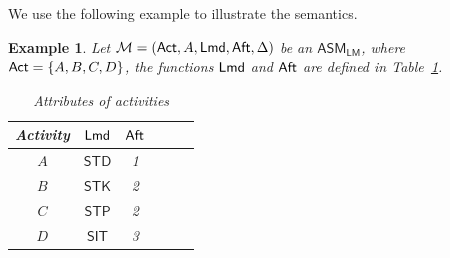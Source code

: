 \documentclass[preprint,12pt]{elsarticle}
\newtheorem{example}{Example}
\newcommand\Mm{{\mathcal{M} }}
\newcommand\act{{\sf Act}}
\newcommand\aft{{\sf Aft}}
\newcommand\lmd{{\sf Lmd}}
\newcommand{\LMAMASS}{\textsf{ASM}_\textsf{LM}}
\newcommand{\STK}{\mathsf{STK}}
\newcommand{\SIT}{\mathsf{SIT}}
\newcommand{\STD}{\mathsf{STD}}
\newcommand{\STP}{\mathsf{STP}}
\begin{document}
	
	We use the following example to illustrate the semantics.
	\begin{example}
		Let $\Mm = (\act,A,\lmd,\aft,\Delta)$ be an $\LMAMASS$, where $\act = \{A,B,C,D\}$, the functions $\lmd$ and $\aft$ are defined in Table~\ref{tab-attribute}.
		\begin{table}[htbp]
			\begin{center}
				\begin{tabular}{|c|c|c|c|c|c|}
					\hline
					Activity & $\lmd$ & $\aft$\\
					\hline
					$A$ & $\STD$ & 1 \\
					\hline
					$B$ & $\STK$ & 2 \\
					\hline
					$C$ & $\STP$ & 2 \\
					\hline
					$D$ & $\SIT$ & 3 \\
					\hline
				\end{tabular}
				\caption{Attributes of activities}
				\label{tab-attribute}
			\end{center}
		\end{table}
		

\end{example}
\end{document}
